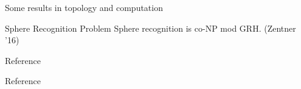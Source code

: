 \documentclass{beamer}
\begin{document}
\begin{section}{Some results in topology and computation}
\begin{frame}{Sphere Recognition Problem}
        Sphere recognition is co-NP mod GRH. (Zentner '16)
\end{frame}{}
\iffalse
\begin{frame}{Knot Equivalence} 
    Given two knots $K_1$ and $K_2$ are they equivalent?
    
    An algorithm was given by Haken '68, Hemion '79, Matveev '07.  
\end{frame}{}
\fi
\iffalse
\begin{frame}{Rademeister moves in knot equivalence}
        In principle given knots with $n_1$ and $n_2$ crossing numbers they are related by at least $\frac{|n_1-n_2|}{2}$ moves as a Rademeister changes crossing number by at most 2. 
        \newline
        \newline
        In practice at-least quadratically many moves may be needed (Haas-Nowik '10). 
        \newline
        \newline
        Given two diagrams of a link with $n$ and $n'$ crossings respectively they differ by a sequence of at most: $2^{2^{.^{.^{.^{2^{n+n'}}}}}}$ where height of tower is $c^{n+n'}$ and $c=10^{1000000}$, Rademeister moves. (Coward-Lackenby '11)
        \newline
        \newline
        For each link type $\kappa$ there is a polynomial $p_\kappa$ such that any two diagrams of $\kappa$ with $c_1$ and $c_2$ crossings are related by at most $p_\kappa(c_1)+p\kappa(c_2)$ moves. (Lackenby, unpublished)
        
        
        
        
\end{frame}{}
\fi  
\end{section}
\begin{section}{Reference}
\begin{frame}[allowframebreaks]{Reference}
    
    
\end{frame}{}
\end{section}
\end{document}
